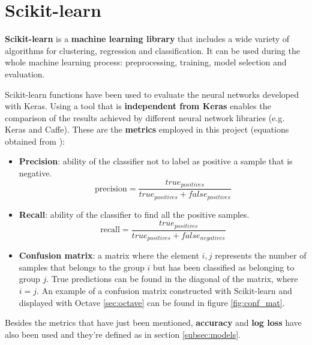 \section{Scikit-learn}\label{sec:sklearn}
\textbf{Scikit-learn} \cite{scikit-learn} is a \textbf{machine learning library} that includes a wide variety of algorithms for clustering, regression and classification. It can be used during the whole machine learning process: preprocessing, training, model selection and evaluation.

Scikit-learn functions have been used to evaluate the neural networks developed with Keras. Using a tool that is \textbf{independent from Keras} enables the comparison of the results achieved by different neural network libraries (e.g. Keras and Caffe). These are the \textbf{metrics} employed in this project (equations obtained from \cite{scikit-doc}):
\begin{itemize}
	\item \textbf{Precision}: ability of the classifier not to label as positive a sample that is negative.
	\begin{equation}\label{eq:precision}
	\textrm{precision}=\frac{true_{positives}}{true_{positives}+false_{positives}}
	\end{equation}
	
	\item \textbf{Recall}: ability of the classifier to find all the positive samples.
	\begin{equation}\label{eq:recall}
	\textrm{recall}=\frac{true_{positives}}{true_{positives}+false_{negatives}}
	\end{equation}
	
	\item \textbf{Confusion matrix}: a matrix where the element $i,j$ represents the number of samples that belongs to the group $i$ but has been classified as belonging to group $j$. True predictions can be found in the diagonal of the matrix, where $i=j$. An example of a confusion matrix constructed with Scikit-learn and displayed with Octave \ref{sec:octave} can be found in figure \ref{fig:conf_mat}.
\end{itemize}

Besides the metrics that have just been mentioned, \textbf{accuracy} and \textbf{log loss} have also been used and they're defined as in section \ref{subsec:models}.

